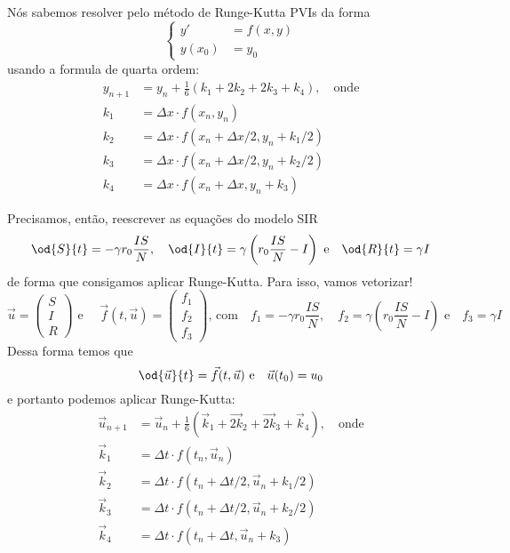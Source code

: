 Nós sabemos resolver pelo método de Runge-Kutta PVIs da forma
\[
	\left\{ \begin{array}{ll}
	y' &= f(x,y) \\
	y(x_{0}) &= y_{0}
	\end{array} \right.
\]
usando a formula de quarta ordem:
\[
	\begin{split}
	y_{n+1} &= y_n + \frac{1}{6} \left( k_1 + 2 k_2 + 2 k_3 + k_4 \right)
	, \quad \text{onde} \\
	k_1 &= \Delta x \cdot f(x_n, y_n) \\
	k_2 &= \Delta x \cdot f(x_n + \Delta x / 2, y_n + k_1 / 2) \\
	k_3 &= \Delta x \cdot f(x_n + \Delta x / 2, y_n + k_2 / 2) \\
	k_4 &= \Delta x \cdot f(x_n + \Delta x , y_n + k_3 )
	\end{split}
\]

Precisamos, então, reescrever as equações do modelo SIR
\[
	\od{S}{t} = - \gamma r_0 \frac{IS}{N} , \quad
	\od{I}{t} = \gamma \left( r_0 \frac{IS}{N} - I \right) \text{ e} \quad
	\od{R}{t} = \gamma I
\]
de forma que consigamos aplicar Runge-Kutta. Para isso, vamos vetorizar!
\[
	\vec{u} = \left( \begin{array}{rr}
	S \\
	I \\
	R
	\end{array} \right) \text{ e } \quad
	\vec{f}(t,\vec{u}) = \left( \begin{array}{rr}
	f_1 \\
	f_2 \\
	f_3
	\end{array} \right) \text{, com} \quad
	f_1 = - \gamma r_0 \frac{IS}{N} , \quad
	f_2 = \gamma \left( r_0 \frac{IS}{N} - I \right) \text{ e} \quad
	f_3 = \gamma I
\]
Dessa forma temos que
\[
	\od{\vec{u}}{t} = \vec{f}(t, \vec{u}) \text{ e} \quad
	\vec{u}(t_0) = u_0
\]
e portanto podemos aplicar Runge-Kutta:
\[
	\begin{split}
	\vec{u}_{n+1} &= \vec{u}_n + \frac{1}{6} \left( \vec{k}_1 + \vec{2 k}_2 + \vec{2 k}_3 + \vec{k}_4 \right)
	, \quad \text{onde} \\
	\vec{k}_1 &= \Delta t \cdot f(t_n, \vec{u}_n) \\
	\vec{k}_2 &= \Delta t \cdot f(t_n + \Delta t / 2, \vec{u}_n + k_1 / 2) \\
	\vec{k}_3 &= \Delta t \cdot f(t_n + \Delta t / 2, \vec{u}_n + k_2 / 2) \\
	\vec{k}_4 &= \Delta t \cdot f(t_n + \Delta t , \vec{u}_n + k_3 )
	\end{split}
\]

